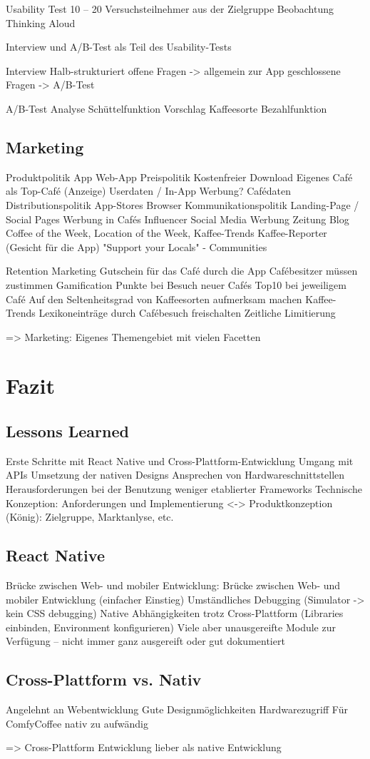 Usability Test
10 – 20 Versuchsteilnehmer aus der Zielgruppe
Beobachtung
Thinking Aloud

Interview und A/B-Test als Teil des Usability-Tests


Interview
Halb-strukturiert
offene Fragen -> allgemein zur App
geschlossene Fragen ->   A/B-Test

A/B-Test
Analyse Schüttelfunktion
Vorschlag Kaffeesorte
Bezahlfunktion



\section{Marketing}
Produktpolitik
App
Web-App
Preispolitik
Kostenfreier Download
Eigenes Café als Top-Café (Anzeige)
Userdaten / In-App Werbung?
Cafédaten
Distributionspolitik
App-Stores
Browser
Kommunikationspolitik
Landing-Page / Social Pages
Werbung in Cafés
Influencer
Social Media Werbung
Zeitung
Blog
Coffee of the Week, Location of the Week, Kaffee-Trends
Kaffee-Reporter (Gesicht für die App)
"Support your Locals" - Communities

Retention Marketing
Gutschein für das Café durch die App
Cafébesitzer müssen zustimmen
Gamification
Punkte bei Besuch neuer Cafés
Top10 bei jeweiligem Café
Auf den Seltenheitsgrad von Kaffeesorten aufmerksam machen
Kaffee-Trends
Lexikoneinträge durch Cafébesuch freischalten
Zeitliche Limitierung

=> Marketing: Eigenes Themengebiet mit vielen Facetten






\chapter{Fazit}
\label{fazit}


\section{Lessons Learned}
Erste Schritte mit React Native und Cross-Plattform-Entwicklung
Umgang mit APIs
Umsetzung der nativen Designs
Ansprechen von Hardwareschnittstellen
Herausforderungen bei der Benutzung weniger etablierter Frameworks
Technische Konzeption: Anforderungen und Implementierung <-> Produktkonzeption (König): Zielgruppe, Marktanlyse, etc.




\section{React Native}
Brücke zwischen Web- und mobiler Entwicklung: Brücke zwischen Web- und mobiler Entwicklung (einfacher Einstieg)
Umständliches Debugging (Simulator -> kein CSS debugging)
Native Abhängigkeiten trotz Cross-Plattform (Libraries einbinden, Environment konfigurieren)
Viele aber unausgereifte Module zur Verfügung – nicht immer ganz ausgereift oder gut dokumentiert


\section{Cross-Plattform vs. Nativ}
Angelehnt an Webentwicklung
Gute Designmöglichkeiten
Hardwarezugriff
Für ComfyCoffee nativ zu aufwändig

=> Cross-Plattform Entwicklung lieber als native Entwicklung